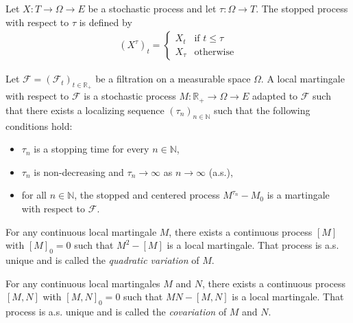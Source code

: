 \begin{definition}\label{def:stoppedProcess}
  \mathlibok
Let $X : T \to \Omega \to E$ be a stochastic process and let $\tau : \Omega \to T$.
The stopped process with respect to $\tau$ is defined by
\begin{align*}
  (X^{\tau})_t = \begin{cases}
    X_t & \text{if } t \le \tau \\
    X_{\tau} & \text{otherwise}
  \end{cases}
\end{align*}
\end{definition}


\begin{definition}\label{def:localMartingale}
Let $\mathcal{F} = (\mathcal{F}_t)_{t \in \mathbb{R}_+}$ be a filtration on a measurable space $\Omega$.
A local martingale with respect to $\mathcal{F}$ is a stochastic process $M : \mathbb{R}_+ \to \Omega \to E$ adapted to $\mathcal{F}$ such that there exists a localizing sequence $(\tau_n)_{n \in \mathbb{N}}$ such that the following conditions hold:
\begin{itemize}
  \item $\tau_n$ is a stopping time for every $n \in \mathbb{N}$,
  \item $\tau_n$ is non-decreasing and $\tau_n \to \infty$ as $n \to \infty$ (a.s.),
  \item for all $n \in \mathbb{N}$, the stopped and centered process $M^{\tau_n} - M_0$ is a martingale with respect to $\mathcal{F}$.
\end{itemize}
\end{definition}


\begin{definition}\label{def:quadraticVariation}
For any continuous local martingale $M$, there exists a continuous process $[M]$ with $[M]_0 = 0$ such that $M^2 - [M]$ is a local martingale. That process is a.s. unique and is called the \emph{quadratic variation} of $M$.
\end{definition}


\begin{definition}\label{def:covariation}
For any continuous local martingales $M$ and $N$, there exists a continuous process $[M,N]$ with $[M,N]_0 = 0$ such that $MN - [M,N]$ is a local martingale. That process is a.s. unique and is called the \emph{covariation} of $M$ and $N$.
\end{definition}




